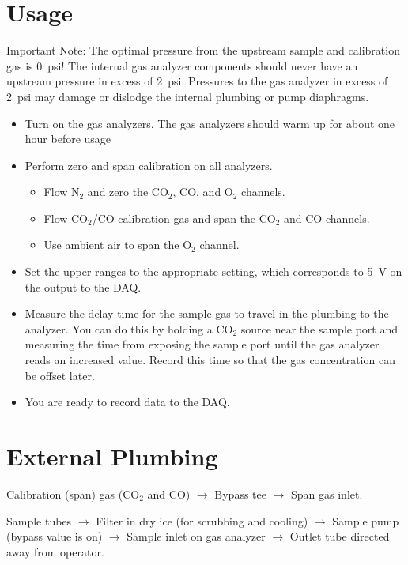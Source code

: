 \documentclass[11pt,oneside]{book}
\begin{document}
\section{Usage}

Important Note: The optimal pressure from the upstream sample and calibration gas is 0~psi! The internal gas analyzer components should never have an upstream pressure in excess of 2~psi. Pressures to the gas analyzer in excess of 2~psi may damage or dislodge the internal plumbing or pump diaphragms.

\begin{itemize}
\item Turn on the gas analyzers. The gas analyzers should warm up for about one hour before usage
\item Perform zero and span calibration on all analyzers.
    \begin{itemize}
    \item Flow N$_2$ and zero the CO$_2$, CO, and O$_2$ channels.
    \item Flow CO$_2$/CO calibration gas and span the CO$_2$ and CO channels.
    \item Use ambient air to span the O$_2$ channel.
    \end{itemize}
\item Set the upper ranges to the appropriate setting, which corresponds to 5~V on the output to the DAQ.
\item Measure the delay time for the sample gas to travel in the plumbing to the analyzer. You can do this by holding a CO$_2$ source near the sample port and measuring the time from exposing the sample port until the gas analyzer reads an increased value. Record this time so that the gas concentration can be offset later.
\item You are ready to record data to the DAQ.
\end{itemize}

\section{External Plumbing}

Calibration (span) gas (CO$_2$ and CO) $\rightarrow$ Bypass tee $\rightarrow$ Span gas inlet.

Sample tubes $\rightarrow$ Filter in dry ice (for scrubbing and cooling) $\rightarrow$ Sample pump (bypass value is on) $\rightarrow$ Sample inlet on gas analyzer $\rightarrow$ Outlet tube directed away from operator.
\end{document}
